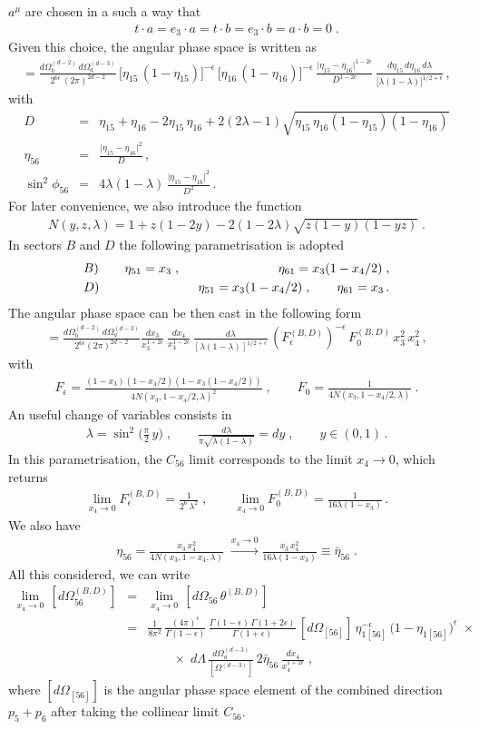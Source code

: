 \documentclass[12pt,a4paper]{article}
\newcommand{\nn}{\nonumber}
\newcommand{\eps}{\epsilon}
\newcommand{\beq}{\begin{eqnarray}}
\newcommand{\eeq}{\end{eqnarray}}
\begin{document}
$a^\mu$ are chosen in a such a way that
\beq
t\cdot a 
= 
e_3 \cdot a
=
t \cdot b
=
e_3 \cdot b
=
a \cdot b
=
0 \; .
\eeq
Given this choice, the angular phase space is written as
\beq
[d\Omega_{56}]
= 
\frac{d\Omega_b^{(d-2)} \, d\Omega_a^{(d-3)}}{2^{6\eps} \, (2\pi)^{2d-2}} \, 
\big[ \eta_{15} \, (1-\eta_{15})\big]^{-\eps} \, 
\big[ \eta_{16} \, (1-\eta_{16})\big]^{-\eps} \, 
\frac{\big| \eta_{15}-\eta_{16}\big|^{1-2\eps}}{D^{1-2\eps}} \,
\frac{d\eta_{15} \, d\eta_{16} \, d\lambda}{\big[\lambda(1-\lambda)\big]^{1/2+\eps}} \, ,
\nn 
\eeq
with
\beq
D 
&=&
\eta_{15}
+ \eta_{16}
- 2 \eta_{15} \, \eta_{16}
+ 2 (2\lambda -1)
\sqrt{\eta_{15} \, \eta_{16} (1-\eta_{15}) (1-\eta_{16})}
\nn \\
\eta_{56} 
&=& 
\frac{\big| \eta_{15}-\eta_{16}\big|^{2}}{D} \, ,
\nn \\
\sin^2 \phi_{56}
&=&
4 \lambda (1-\lambda) \, \frac{\big| \eta_{15}-\eta_{16}\big|^{2}}{D^2} \, .
\eeq
For later convenience, we also introduce the function
\beq
N(y, z, \lambda) 
= 
1 
+ z(1-2y)
-2(1-2\lambda)
\sqrt{z(1-y)(1-y z)} \; .
\eeq
In sectors $B$ and $D$ the following parametrisation is
adopted
\beq
&B)& \quad \eta_{51} = x_3 \; , 
\hspace{27mm}
\eta_{61} = x_3 (1-x_4/2)  \; , 
\nn \\
&D)& \quad \eta_{51} = x_3 (1-x_4/2)  \; , 
\qquad 
\eta_{61} = x_3  \, .
\eeq
The angular phase space can be then cast in the following form
\beq
[d\Omega_{56}^{(B,D)}] 
=
\frac{d\Omega_b^{(d-2)} \, d\Omega_a^{(d-3)}}{2^{6\eps} (2\pi)^{2d-2}}
\frac{dx_3}{x_3^{1+2\eps}} \, 
\frac{dx_4}{x_4^{1-2\eps}} \, 
\frac{d\lambda}{[\lambda(1-\lambda)]^{1/2+\eps}} \, 
(F_\epsilon^{(B,D)})^{-\eps} \, 
F_0^{(B,D)} \, x_3^2 \, x_4^2 \, ,
\eeq
with
\beq
F_\eps 
=
\frac{(1-x_3) (1-x_4/2) (1-x_3(1-x_4/2))}{4 N(x_3,1-x_4/2,\lambda)^2} \; , 
\qquad
F_0
=
\frac{1}{4 N(x_3, 1-x_4/2,\lambda)} \; .
\eeq
An useful change of variables consists in
\beq
\lambda = \sin^2 \Big( \frac{\pi}{2} \, y\Big) \; , 
\qquad
\frac{d\lambda}{\pi \sqrt{\lambda(1-\lambda)}} = dy \; , 
\qquad 
y \in (0,1) \, .
\eeq
In this parametrisation, the $C_{56}$ limit corresponds to the limit
$x_4 \rightarrow 0$, which returns
\beq
\lim_{x_4 \rightarrow 0}
F_{\eps}^{(B,D)}
= 
\frac{1}{2^6 \, \lambda^2} \; , 
\qquad
\lim_{x_4 \rightarrow 0}
F_0^{(B,D)}
=
\frac{1}{16\lambda(1-x_3)} \, .
\eeq
We also have
\beq
\eta_{56} 
=
\frac{x_3 \, x_4^2}{4 N(x_3, 1-x_4, \lambda)}
\; 
\overset{x_4 \rightarrow 0}{\longrightarrow}
\frac{x_3 \, x_4^2}{16 \lambda (1-x_3)}
\equiv \bar{\eta}_{56} \; .
\eeq
All this considered, we can write
\beq
\lim_{x_4 \rightarrow 0} \, 
[d\Omega_{56}^{(B,D)}] 
&=&
\lim_{x_4 \rightarrow 0} \, 
[d\Omega_{56} \, \theta^{(B,D)}] 
\nn \\
&=&
\frac{1}{8 \pi^2} \, \frac{(4\pi)^\eps}{\Gamma(1-\eps)} \, 
\frac{\Gamma(1-\eps) \, \Gamma(1+2\eps)}{\Gamma(1+\eps)} \,
[d\Omega_{[56]}] \, 
\eta_{1[56]}^{-\eps} \, 
\big(1-\eta_{1[56]}\big)^\eps \; \times
\nn \\
&& \qquad \times \; 
d\Lambda \, 
\frac{d\Omega_a^{(d-3)}}{[\Omega^{(d-3)}]} \, 
2 \bar{\eta}_{56} \, 
\frac{dx_4}{x_4^{1+2\eps}} \; ,
\eeq
where $[d\Omega_{[56]}]$ is the angular phase space
element of the combined direction $p_5+p_6$ after
taking the collinear limit $C_{56}$.
\end{document}
